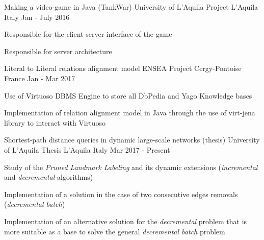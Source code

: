 \begin{cventries}
\cventry
{Making a video-game in Java (TankWar)} %
{University of L'Aquila Project} %
{L'Aquila Italy} %
{Jan - July 2016} %
{ %
	\begin{cvitems}
		\item {Responsible for the client-server interface of the game}
		\item {Responsible for server architecture}
	\end{cvitems}
}

\cventry
{Literal to Literal relations alignment model} %
{ENSEA Project} %
{Cergy-Pontoise France} %
{Jan - Mar 2017} %
{ %
	\begin{cvitems}
		\item {Use of Virtuoso DBMS Engine to store all DbPedia and Yago Knowledge bases}
		\item {Implementation of relation alignment model in Java through the use of virt-jena library to interact with Virtuoso}
	\end{cvitems}
}

\cventry
{Shortest-path distance queries in dynamic large-scale networks (thesis)} %
{University of L'Aquila Thesis} %
{L'Aquila Italy} %
{Mar 2017 - Present} %
{ %
	\begin{cvitems}
		\item {Study of the \textit{Pruned Landmark Labeling} and its dynamic extensions (\textit{incremental} and \textit{decremental} algorithms)}
		\item {Implementation of a solution in the case of two consecutive edges removals (\textit{decremental batch})}
		\item {Implementation of an alternative solution for the \textit{decremental} problem that is more suitable as a base to solve the general \textit{decremental batch} problem}
	\end{cvitems}
}

\end{cventries}